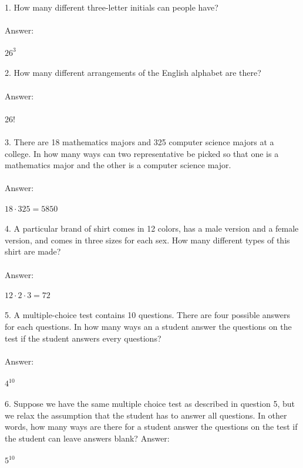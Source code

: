 \documentclass[11pt]{article}
\begin{document}
1. How many different three-letter initials can people have?\\\\
Answer: \\\\
$26^3$\\\\
2. How many different arrangements of the English alphabet are there?\\\\
Answer: \\\\
26!\\\\
3. There are 18 mathematics majors and 325 computer science majors at a college. In how many ways can two representative be picked so that one is a mathematics major and the other is a computer science major.\\\\
Answer: \\\\
$18 \cdot 325 = 5850$\\\\
4. A particular brand of shirt comes in 12 colors, has a male version and a female version, and comes in three sizes for each sex. How many different types of this shirt are made?\\\\
Answer: \\\\
$ 12 \cdot 2 \cdot 3= 72$\\\\
5. A multiple-choice test contains 10 questions. There are four possible answers for each questions. In how many ways an a student answer the questions on the test if the student answers every questions?\\\\
Answer: \\\\
$ 4^{10} $\\\\
6. Suppose we have the same multiple choice test as described in question 5, but we relax the assumption that the student has to answer all questions.  In other words, how many ways are there for a student answer the questions on the test if the student can leave answers blank?
Answer: \\\\
$5^{10}$\\\\
\end{document}
